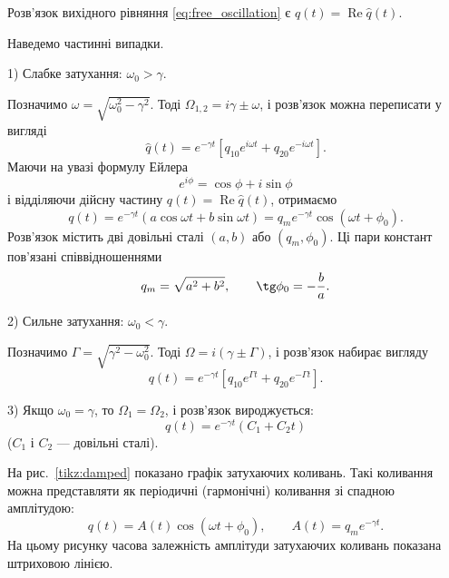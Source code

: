 Розв'язок вихідного рівняння \eqref{eq:free_oscillation} є $q(t) = \operatorname{Re}\hat{q}(t)$.

Наведемо частинні випадки.

1) Слабке затухання: $\omega_0 > \gamma$.

Позначимо $\omega = \sqrt{\omega_0^2 - \gamma^2}$. Тоді $\Omega_{1,2} = i\gamma \pm
\omega$, і розв'язок можна переписати у вигляді
\begin{equation}\label{eq:weak_damping_complex}
	\hat{q}(t) = e^{-\gamma t}\left[q_{10} e^{i\omega t} + q_{20} e^{-i\omega t}\right].
\end{equation}
Маючи на увазі формулу Ейлера
\begin{equation}\label{eq:Euler}
	e^{i\phi} = \cos\phi + i\sin\phi
\end{equation}
і відділяючи дійсну частину $q(t) = \operatorname{Re}\hat{q}(t)$, отримаємо
\begin{equation}\label{eq:weak_damping}
	q(t) = e^{-\gamma t}\left(a\cos\omega t + b\sin\omega t\right) = q_m e^{-\gamma t}\cos(\omega t + \phi_0).
\end{equation}
Розв'язок містить дві довільні сталі $(a, b)$ або $(q_m, \phi_0)$.
Ці пари констант пов'язані співвідношеннями
\begin{equation}\label{eq:constants_relation}
	q_m = \sqrt{a^2 + b^2}, \qquad \tg\phi_0 = -\frac{b}{a}.
\end{equation}

2) Сильне затухання: $\omega_0 < \gamma$.

Позначимо $\Gamma = \sqrt{\gamma^2 - \omega_0^2}$. Тоді $\Omega = i(\gamma \pm \Gamma)$, і розв'язок набирає вигляду
\begin{equation}\label{eq:strong_damping}
	q(t) = e^{-\gamma t}\left[q_{10} e^{\Gamma t} + q_{20} e^{-\Gamma t}\right].
\end{equation}

3) Якщо $\omega_0 = \gamma$, то $\Omega_1 = \Omega_2$, і розв'язок вироджується:
\begin{equation}\label{eq:critical_damping}
	q(t) = e^{-\gamma t}\left(C_1 + C_2 t\right)
\end{equation}
($C_1$ і $C_2$ --- довільні сталі).

На рис.~\ref{tikz:damped} показано графік затухаючих коливань. Такі коливання можна представляти як періодичні (гармонічні) коливання зі спадною амплітудою:
\begin{equation}\label{eq:damped_general}
	q(t) = A(t)\cos(\omega t + \phi_0), \qquad A(t) = q_m e^{-\gamma t}.
\end{equation}
На цьому рисунку часова залежність амплітуди затухаючих коливань показана штриховою лінією.


